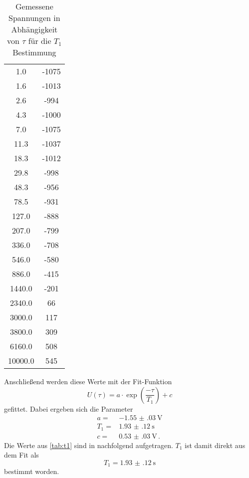 \begin{table}
    \centering
    \caption{Gemessene Spannungen in Abhängigkeit von $\tau$ für die $T_1$ Bestimmung}
    \label{tab:t1}
    \begin{tabular}{S[table-format=5.1] S[table-format=4.0]}
        \toprule
        \tableSI{\tau}{\milli\second} &   \\
         &  -1075  \\
        1.6 & -1013 \\
        2.6 & -994 \\
        4.3 & -1000 \\
        7.0 & -1075 \\
        11.3 & -1037 \\
        18.3 & -1012 \\
        29.8 & -998 \\
        48.3 & -956 \\
        78.5 & -931 \\
        127.0 & -888 \\
        207.0 & -799 \\
        336.0 & -708 \\
        546.0 & -580 \\
        886.0 & -415 \\
        1440.0 & -201 \\
        2340.0 & 66 \\
        3000.0 & 117 \\
        3800.0 & 309 \\
        6160.0 & 508 \\
        10000.0 & 545 \\
        \bottomrule
    \end{tabular}
\end{table}

Anschließend werden diese Werte mit der Fit-Funktion 
\begin{equation}
    U(\tau) = a \cdot \exp(\frac{- \tau}{T_1}) + c 
    \label{eq:fit_t1}
\end{equation}
gefittet.
Dabei ergeben sich die Parameter 
\begin{align*}
    a =& \SI{-1.55(03)}{\volt} \\
    T_1 =& \SI{1.93(12)}{\second} \\
    c =& \SI{0.53(03)}{\volt} \, .
\end{align*}
Die Werte aus \autoref{tab:t1} sind in nachfolgend aufgetragen.
$T_1$ ist damit direkt aus dem Fit als 
\begin{equation*}
    T_1 = \SI{1.93(12)}{\second}
\end{equation*}
bestimmt worden.

